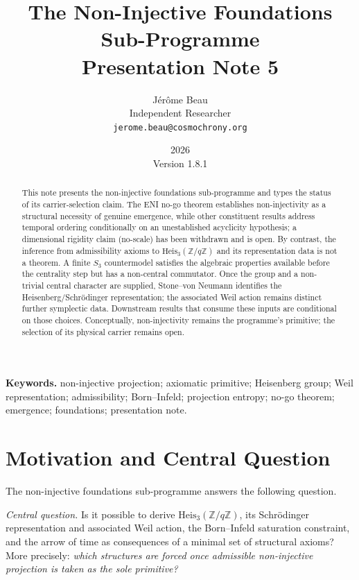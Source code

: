 \documentclass[11pt,a4paper]{article}
\title{The Non-Injective Foundations Sub-Programme\\[0.4em]
\large Presentation Note 5}
\author{J\'{e}r\^{o}me Beau\\[0.3em]
\small Independent Researcher\\
\small \texttt{jerome.beau@cosmochrony.org}}
\date{2026\\[2pt]\small Version 1.8.1}
\theoremstyle{definition}
\newcommand{\Heis}{\mathrm{Heis}}
\begin{document}
  \maketitle

  \begin{abstract}
    This note presents the non-injective foundations sub-programme and types the status of
    its carrier-selection claim.  The ENI no-go theorem establishes non-injectivity as a
    structural necessity of genuine emergence, while other constituent results address
    temporal ordering conditionally on an unestablished acyclicity hypothesis; a dimensional rigidity
    claim (no-scale) has been withdrawn and is open.  By contrast,
    the inference from admissibility axioms to
    $\Heis_3(\mathbb{Z}/q\mathbb{Z})$ and its representation data is not a theorem.
    A finite $S_3$ countermodel satisfies the algebraic properties available before the
    centrality step but has a non-central commutator.  Once the group and a non-trivial central
    character are supplied, Stone--von Neumann identifies the Heisenberg/Schr\"odinger
    representation; the associated Weil action remains distinct further symplectic data.
    Downstream results that consume these inputs are conditional on those choices.
    Conceptually, non-injectivity remains the programme's
    primitive; the selection of its physical carrier remains open.
  \end{abstract}

  \medskip
  \noindent\textbf{Keywords.}
  non-injective projection; axiomatic primitive; Heisenberg group; Weil representation;
  admissibility; Born--Infeld; projection entropy; no-go theorem; emergence; foundations;
  presentation note.

  \newpage
  \tableofcontents

  \newpage

  \section{Motivation and Central Question}
    \label{sec:motivation}

    The non-injective foundations sub-programme answers the following question.

    \medskip
    \noindent\textit{Central question.}
    Is it possible to derive $\Heis_3(\mathbb{Z}/q\mathbb{Z})$, its Schr\"odinger representation
    and associated Weil action,
    the Born--Infeld saturation constraint, and the arrow of time as consequences of a
    minimal set of structural axioms?
    More precisely:
    \textit{which structures are forced once admissible non-injective projection is taken
    as the sole primitive?}
\end{document}
